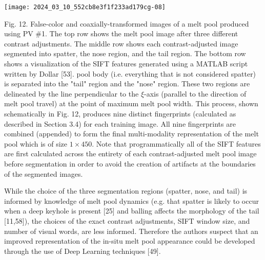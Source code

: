 \documentclass[10pt]{article}
\begin{document}
\begin{center}
\texttt{[image: 2024\_03\_10\_552cb8e3f1f233ad179cg-08]}
\end{center}

Fig. 12. False-color and coaxially-transformed images of a melt pool produced using PV \#1. The top row shows the melt pool image after three different contrast adjustments. The middle row shows each contrast-adjusted image segmented into spatter, the nose region, and the tail region. The bottom row shows a visualization of the SIFT features generated using a MATLAB script written by Dollar [53]. pool body (i.e. everything that is not considered spatter) is separated into the "tail" region and the "nose" region. These two regions are delineated by the line perpendicular to the $\xi$-axis (parallel to the direction of melt pool travel) at the point of maximum melt pool width. This process, shown schematically in Fig. 12, produces nine distinct fingerprints (calculated as described in Section 3.4) for each training image. All nine fingerprints are combined (appended) to form the final multi-modality representation of the melt pool which is of size $1 \times 450$. Note that programmatically all of the SIFT features are first calculated across the entirety of each contrast-adjusted melt pool image before segmentation in order to avoid the creation of artifacts at the boundaries of the segmented images.

While the choice of the three segmentation regions (spatter, nose, and tail) is informed by knowledge of melt pool dynamics (e.g. that spatter is likely to occur when a deep keyhole is present [25] and balling affects the morphology of the tail [11,58]), the choices of the exact contrast adjustments, SIFT window size, and number of visual words, are less informed. Therefore the authors suspect that an improved representation of the in-situ melt pool appearance could be developed through the use of Deep Learning techniques [49].
\end{document}
